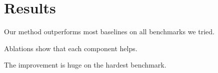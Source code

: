 \section{Results}
Our method outperforms most baselines on all benchmarks we tried.

Ablations show that each component helps.

The improvement is huge on the hardest benchmark.
